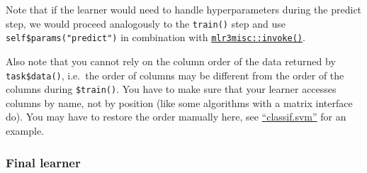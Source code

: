 \documentclass[]{article}
\newenvironment{Shaded}{}{}
\newcommand{\ControlFlowTok}[1]{\textcolor[rgb]{0.00,0.00,1.00}{#1}}
\newcommand{\DataTypeTok}[1]{#1}
\newcommand{\KeywordTok}[1]{\textcolor[rgb]{0.00,0.00,1.00}{#1}}
\newcommand{\NormalTok}[1]{#1}
\newcommand{\OperatorTok}[1]{#1}
\newcommand{\OtherTok}[1]{\textcolor[rgb]{1.00,0.25,0.00}{#1}}
\newcommand{\StringTok}[1]{\textcolor[rgb]{0.00,0.50,0.50}{#1}}
\renewenvironment{Shaded} {\begin{snugshade}\small} {\end{snugshade}}
\begin{document}
\begin{Shaded}
\end{Shaded}

Note that if the learner would need to handle hyperparameters during the predict step, we would proceed analogously to the \texttt{train()} step and use \texttt{self\$params("predict")} in combination with \href{https://mlr3misc.mlr-org.com/reference/invoke.html}{\texttt{mlr3misc::invoke()}}.

Also note that you cannot rely on the column order of the data returned by \texttt{task\$data()}, i.e.~the order of columns may be different from the order of the columns during \texttt{\$train()}.
You have to make sure that your learner accesses columns by name, not by position (like some algorithms with a matrix interface do).
You may have to restore the order manually here, see \href{https://github.com/mlr-org/mlr3learners/blob/master/R/LearnerClassifSVM.R}{``classif.svm''} for an example.

\hypertarget{final-learner}{%
\subsubsection{Final learner}\label{final-learner}}
\end{document}
